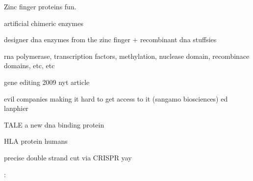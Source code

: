 \documentclass{report}
\begin{document}


Zinc finger proteins fun. 


artificial chimeric enzymes

designer dna enzymes from the zinc finger + recombinant dna stuffsies 

rna polymerase, transcription factors, methylation, nuclease domain, recombinace domains, etc, etc

gene editing 2009 nyt article 


evil companies making it hard to get access to it (sangamo biosciences) ed lanphier 

TALE a new dna binding protein 

HLA protein humans 

precise double strand cut via CRISPR yay 

:
\end{document}
